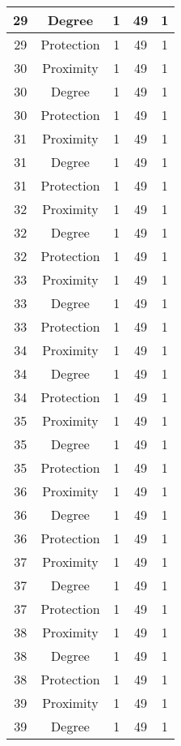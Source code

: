 \documentclass[results.tex]{subfiles}
\begin{document}
\begin{center}
\begin{tabular}{| c || c | c | c | c |}
    29 & Degree & 1 & 49 & 1 \\ 
    \hline
    29 & Protection & 1 & 49 & 1 \\ 
    \hline
    30 & Proximity & 1 & 49 & 1 \\ 
    \hline
    30 & Degree & 1 & 49 & 1 \\ 
    \hline
    30 & Protection & 1 & 49 & 1 \\ 
    \hline
    31 & Proximity & 1 & 49 & 1 \\ 
    \hline
    31 & Degree & 1 & 49 & 1 \\ 
    \hline
    31 & Protection & 1 & 49 & 1 \\ 
    \hline
    32 & Proximity & 1 & 49 & 1 \\ 
    \hline
    32 & Degree & 1 & 49 & 1 \\ 
    \hline
    32 & Protection & 1 & 49 & 1 \\ 
    \hline
    33 & Proximity & 1 & 49 & 1 \\ 
    \hline
    33 & Degree & 1 & 49 & 1 \\ 
    \hline
    33 & Protection & 1 & 49 & 1 \\ 
    \hline
    34 & Proximity & 1 & 49 & 1 \\ 
    \hline
    34 & Degree & 1 & 49 & 1 \\ 
    \hline
    34 & Protection & 1 & 49 & 1 \\ 
    \hline
    35 & Proximity & 1 & 49 & 1 \\ 
    \hline
    35 & Degree & 1 & 49 & 1 \\ 
    \hline
    35 & Protection & 1 & 49 & 1 \\ 
    \hline
    36 & Proximity & 1 & 49 & 1 \\ 
    \hline
    36 & Degree & 1 & 49 & 1 \\ 
    \hline
    36 & Protection & 1 & 49 & 1 \\ 
    \hline
    37 & Proximity & 1 & 49 & 1 \\ 
    \hline
    37 & Degree & 1 & 49 & 1 \\ 
    \hline
    37 & Protection & 1 & 49 & 1 \\ 
    \hline
    38 & Proximity & 1 & 49 & 1 \\ 
    \hline
    38 & Degree & 1 & 49 & 1 \\ 
    \hline
    38 & Protection & 1 & 49 & 1 \\ 
    \hline
    39 & Proximity & 1 & 49 & 1 \\ 
    \hline
    39 & Degree & 1 & 49 & 1 \\ 

\end{tabular}
\end{center}
\end{document}
